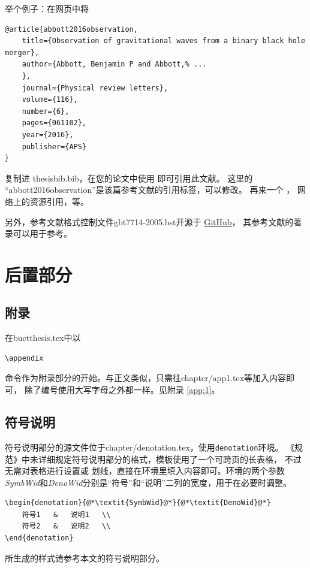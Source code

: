 举个例子：在网页中将
\begin{lstlisting}
@article{abbott2016observation,
	title={Observation of gravitational waves from a binary black hole merger},
	author={Abbott, Benjamin P and Abbott,% ...
	},
	journal={Physical review letters},
	volume={116},
	number={6},
	pages={061102},
	year={2016},
	publisher={APS}
}
	\end{lstlisting}
复制进 \textsf{thesisbib.bib}，在您的论文中使用
即可引用此文献。
这里的 “abbott2016observation”是该篇参考文献的引用标签，可以修改。
再来一个\cite{ashirov2008tetramerization} ，
网络上的资源引用\cite{buctthesis}，等。

另外，参考文献格式控制文件\textsf{gbt7714-2005.bst}开源于
\href{https://github.com/Haixing-Hu/GBT7714-2005-BibTeX-Style}{GitHub}，
其参考文献的著录可以用于参考。

\section{后置部分}\label{sec:backmatter}
\subsection{附录}\label{sec:app}
在\textsf{buctthesis.tex}中以
\begin{lstlisting}[firstnumber=68]
\appendix
		\end{lstlisting}
命令作为附录部分的开始。与正文类似，只需往\textsf{chapter/app1.tex}等加入内容即可，
除了编号使用大写字母之外都一样。见附录 \ref{app:1}。

\subsection{符号说明}\label{sec:deno}
符号说明部分的源文件位于\textsf{chapter/denotation.tex}，使用\texttt{denotation}环境。
《规范》中未详细规定符号说明部分的格式，模板使用了一个可跨页的长表格，
不过无需对表格进行设置或	划线，直接在环境里填入内容即可。环境的两个参数
\textit{SymbWid}和\textit{DenoWid}分别是“符号”和“说明”二列的宽度，用于在必要时调整。

\begin{lstlisting}
\begin{denotation}{@*\textit{SymbWid}@*}{@*\textit{DenoWid}@*}
	符号1   &   说明1   \\
	符号2   &   说明2   \\
\end{denotation}
		\end{lstlisting}
所生成的样式请参考本文的符号说明部分。

